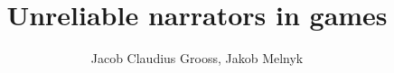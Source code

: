 \documentclass[conference]{IEEEtran}
\begin{document}
\title{\ \\ \LARGE\bf Unreliable narrators in games}

\author{Jacob Claudius Grooss, Jakob Melnyk}

\newcommand{\insertPicture}[3]{
\begin{figure}[h!]
  \centering
\texttt{[image: Parts/\#2]}
\caption{#3}
\label{fig:#2}
\end{figure}
}


\maketitle











\

%
%
%
%



\end{document}
